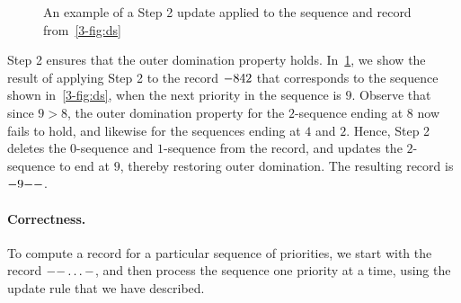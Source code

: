 \begin{figure}[!ht]
    \begin{center}
    \end{center}
    \caption{An example of a Step 2 update applied to the sequence and record from~\cref{3-fig:ds}}
\label{3-fig:ds2}
\end{figure}

Step 2 ensures that the outer domination property holds. 
In~\cref{3-fig:ds2}, we show the result of applying Step 2 to the record
$\mathtt{-} 8 4 2$ that corresponds to the sequence shown in~\cref{3-fig:ds},
when the next priority in the sequence is $9$. Observe that since $9 > 8$, the
outer domination property for the $2$-sequence ending at $8$ now fails to hold,
and likewise for the sequences ending at $4$ and $2$. Hence, Step 2 deletes the
$0$-sequence and $1$-sequence from the record, and updates the $2$-sequence to
end at $9$, thereby restoring outer domination. The resulting record is $\mathtt{-}
9 \mathtt{-} \mathtt{-}$.

\paragraph{\bf Correctness.} 
To compute a record for a particular sequence of priorities, we start with the
record $\mathtt{-} \mathtt{-} \dots \mathtt{-}$, and then process the sequence one
priority at a time, using the update rule that we have described. 

